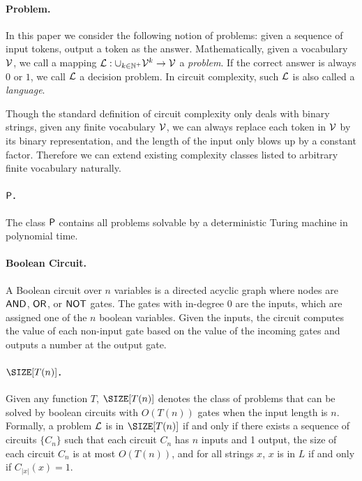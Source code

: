 \paragraph{Problem.} In this paper we consider the following notion of problems: given a sequence of input tokens, output a token as the answer. Mathematically, given a vocabulary $\gV$, we call a mapping $\gL:\cup_{k\in\mathbb{N}^+}\gV^k\to\gV$ a \emph{problem}. If the correct answer is always $0$ or $1$, we call $\gL$ a decision problem. In circuit complexity, such $\gL$ is also called a \emph{language}.  


Though the standard definition of circuit complexity only deals with binary strings, given any finite vocabulary $\gV$, we can always replace each token in $\gV$ by its binary representation, and the length of the input only blows up by a constant factor. Therefore we can extend existing complexity classes listed to arbitrary finite vocabulary naturally. 

\paragraph{$\P$.} The class $\P$ contains all problems solvable by a deterministic Turing machine in polynomial time. 




\paragraph{Boolean Circuit.} A Boolean circuit over $n$ variables is a directed acyclic graph where nodes are $\AND$, $\OR$, or $\NOT$ gates. The gates with in-degree 0 are the inputs, which are assigned one of the $n$ boolean variables. Given the inputs, the circuit computes the value of each non-input gate based on the value of the incoming gates and outputs a number at the output gate.

\paragraph{$\SIZE[T(n)]$.} Given any function $T$, $\SIZE[T(n)]$ denotes the class of problems that can be solved by boolean circuits with $O(T(n))$ gates when the input length is $n$.  Formally, a problem $\gL$ is in $\SIZE[T(n)]$ if and only if there exists a sequence of circuits $\{C_n\}$ such that each circuit $C_n$ has $n$ inputs and 1 output, the size of each circuit $C_n$ is at most $O(T(n))$, and for all strings $x$, $x$ is in $L$ if and only if $C_{|x|}(x) = 1$.

